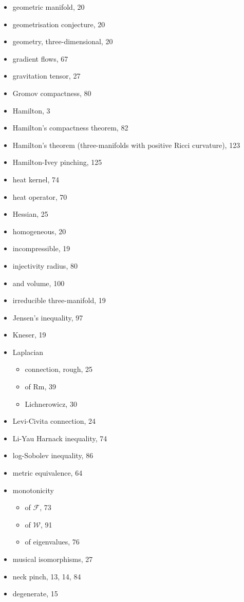\begin{itemize}
\item geometric manifold, 20
\item geometrisation conjecture, 20
\item geometry, three-dimensional, 20
\item gradient flows, 67
\item gravitation tensor, 27
\item Gromov compactness, 80
\item Hamilton, 3
\item Hamilton's compactness theorem, 82
\item Hamilton's theorem (three-manifolds
    with positive Ricci curvature),
    123
\item Hamilton-Ivey pinching, 125
\item heat kernel, 74
\item heat operator, 70
\item Hessian, 25
\item homogeneous, 20
\item incompressible, 19
\item injectivity radius, 80
\item and volume, 100
\item irreducible three-manifold, 19
\item Jensen’s inequality, 97
\item Kneser, 19
\item Laplacian
\begin{itemize}
\item connection, rough, 25
\item of Rm, 39
\item Lichnerowicz, 30
\end{itemize}
\item Levi-Civita connection, 24
\item Li-Yau Harnack inequality, 74
\item log-Sobolev inequality, 86
\item metric equivalence, 64
\item monotonicity
\begin{itemize}
\item of $\mathcal{F}$, 73
\item of $\mathcal{W}$, 91
\item of eigenvalues, 76
\end{itemize}
\item musical isomorphisms, 27
\item neck pinch, 13, 14, 84
\item degenerate, 15

\end{itemize}
